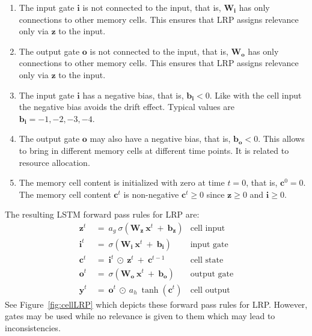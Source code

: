 \documentclass{article}
\newcommand\Bb{\bm{b}}
\newcommand\Bc{\bm{c}}
\newcommand\Bi{\bm{i}}
\newcommand\Bo{\bm{o}}
\newcommand\Bx{\bm{x}}
\newcommand\By{\bm{y}}
\newcommand\Bz{\bm{z}}
\newcommand\BW{\bm{W}}
\renewcommand{\geq}{\geqslant}
\begin{document}
\begin{appendices}
\begin{enumerate}[label=\textbf{(A\arabic*)}]
\item The input gate $\Bi$ is not connected to the input, that is,
  $\BW_{\Bi}$ has only connections to other memory cells. This ensures
  that LRP assigns relevance only via $\Bz$ to the input.

\item The output gate $\Bo$ is not connected to the input, that is,
  $\BW_{\Bo}$ has only connections to other memory cells. This ensures
  that LRP assigns relevance only via $\Bz$ to the input.

\item The input gate $\Bi$ has a negative bias, that is,
  $\Bb_{\Bi}<0$. Like with the cell input the negative bias
  avoids the drift effect.
  Typical values are $\Bb_{\Bi}=-1,-2,-3,-4$.

\item The output gate $\Bo$ may also have a negative bias, that is,
  $\Bb_{\Bo}<0$. This allows to bring in different memory cells at
  different time points. It is related to resource allocation.
  
\item The memory cell content is initialized with zero at time $t=0$,
  that is, $\Bc^0=0$. The memory cell content $\Bc^t$ 
  is non-negative $\Bc^t \geq 0$ since 
  $\Bz \geq 0$ and $\Bi\geq 0$.
 
\end{enumerate}

The resulting LSTM forward pass rules for LRP are:
\begin{align}
\Bz^t \ &= \ a_g \ \sigma \left( \BW_{\Bz} \ \Bx^t \ + \
   \Bb_{\Bz}\right) & \text{cell input} \\
\Bi^t \ &= \ \sigma \left( \BW_{\Bi} \ \Bx^t \ + \
    \Bb_{\Bi} \right) & \text{input gate} \\
\Bc^t \ &= \  \Bi^t \ \odot \ \Bz^t \ + \ \Bc^{t-1} & \text{cell state} \\
\Bo^t \ &= \ \sigma \left( \BW_{\Bo} \ \Bx^t \ + \
  \Bb_{\Bo} \right) & \text{output gate} \\
\By^t \ &= \ \Bo^t \ \odot \ a_h \ \tanh\left( \Bc^t \right) &
\text{cell output}
\end{align}
See Figure~\ref{fig:cellLRP} which depicts these  
forward pass rules for LRP. However, gates may be used while no
relevance is given to them which may lead to inconsistencies.



\end{appendices}
\end{document}

